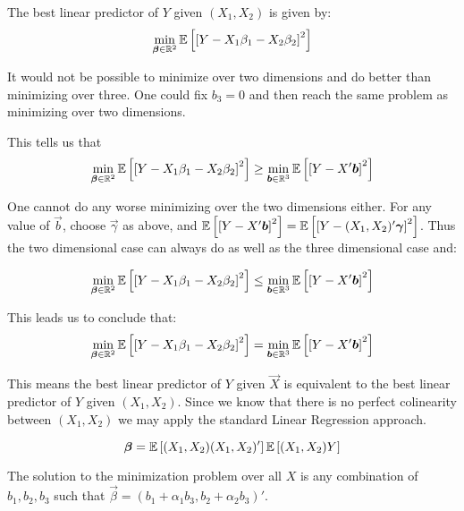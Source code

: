 \documentclass[12pt]{paper}
\begin{document}
The best linear predictor of $Y$ given $(X_1,X_2)$ is given by:
\begin{equation*}
  \min_{\bm{ \beta } \in \mathbb{R}^2} \mathbb{E} \left [  \left [  Y - X_1 \beta_1 - X_2 \beta_2 \right ]^2 \right ]
\end{equation*}

It would not be possible to minimize over two dimensions and do better
than minimizing over three. One could fix $b_3 = 0$ and then reach
the same problem as minimizing over two dimensions.

This tells us that
\begin{equation*}
  \min_{\bm{ \beta } \in \mathbb{R}^2} \mathbb{E} \left [  \left [  Y - X_1 \beta_1 - X_2 \beta_2 \right ]^2 \right ] \geq
  \min_{\bm{ b } \in \mathbb{R}^3} \mathbb{E} \left [  \left [ Y - X' \bm{ b } \right ]^2 \right ]
\end{equation*}

One cannot do any worse minimizing over the two dimensions either. For
any value of $\vec{b}$, choose $\vec{\gamma}$ as above, and $\mathbb{E} \left [  \left [  Y -
  X' \bm{ b } \right ]^2 \right ] = \mathbb{E} \left [  \left [  Y - (X_1, X_2)' \bm{ \gamma } \right ]^2 \right ]$. Thus the two
dimensional case can always do as well as the three dimensional case
and:

\begin{equation*}
  \min_{\bm{ \beta } \in \mathbb{R}^2} \mathbb{E} \left [  \left [  Y - X_1 \beta_1 - X_2 \beta_2 \right ]^2 \right ] \leq
  \min_{\bm{ b } \in \mathbb{R}^3} \mathbb{E} \left [  \left [ Y - X' \bm{ b } \right ]^2 \right ]  
\end{equation*}

This leads us to conclude that:
\begin{equation*}
  \min_{\bm{ \beta } \in \mathbb{R}^2} \mathbb{E} \left [  \left [  Y - X_1 \beta_1 - X_2 \beta_2 \right ]^2 \right ] =
  \min_{\bm{ b } \in \mathbb{R}^3} \mathbb{E} \left [  \left [ Y - X' \bm{ b } \right ]^2 \right ]
\end{equation*}

This means the best linear predictor of $Y$ given $\vec{X}$ is equivalent to
the best linear predictor of $Y$ given $(X_1,X_2)$. Since we know that
there is no perfect colinearity between $(X_1,X_2)$ we may apply the
standard Linear Regression approach.

\begin{equation*}
  \bm{ \beta } = \mathbb{E} \left [  (X_1, X_2) (X_1, X_2)' \right ]\mathbb{E} \left [  (X_1, X_2)Y \right ] 
\end{equation*}

The solution to the minimization problem over all $X$ is any
combination of $b_1, b_2, b_3$ such that
$\vec{\beta} = (b_1 + \alpha_1 b_3, b_2 + \alpha_2 b_3)'$.
\end{document}
